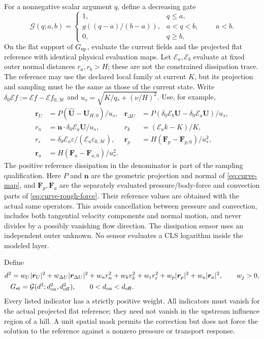 \documentclass[11pt,a4paper]{article}
\numberwithin{equation}{section}
\newcommand{\eps}{\varepsilon}
\newcommand{\qs}{q_*}
\begin{document}
For a nonnegative scalar argument $q$, define a decreasing gate
\begin{equation}
 \mathcal G(q;a,b)=
 \begin{cases}
 1,&q\le a,\\
 g((q-a)/(b-a)),&a<q<b,\\
 0,&q\ge b,
 \end{cases}
 \qquad a<b.
 \label{eq:transition-gate}
\end{equation}
On the flat support of $G_{\rm sp}$, evaluate the current fields and
the projected flat reference with identical physical evaluation maps.
Let $\mathcal E_a,\mathcal E_b$ evaluate at fixed outer normal distances
$r_a,r_b>H$; these are not the constrained dissipation trace.
The reference may use the declared local family at current $K$, but
its projection and sampling must be the same as those of the current
state. Write $\delta_0\mathcal E f:=\mathcal E f-\mathcal E f_{0,\mathcal M}$
and $u_s=\sqrt{K/\qs+(\nu/H)^2}$. Use, for example,
\begin{align}
 \bm r_U&=P(\widehat{\bm U}-\bm U_{H,0})/u_s,
 &\bm r_{\Delta U}&=P(\delta_0\mathcal E_b\bm U-
                         \delta_0\mathcal E_a\bm U)/u_s,\nonumber\\
 r_n&=\bm n\cdot\delta_0\mathcal E_a\bm U/u_s,
 &r_k&=(\mathcal E_a k-K)/K,\nonumber\\
 r_\eps&=\delta_0\mathcal E_a\eps/
                  (\mathcal E_a\eps_{0,\mathcal M}),
 &\bm r_p&=H(\bm F_p-\bm F_{p,0})/u_s^2,\nonumber\\
 \bm r_a&=H(\bm F_a-\bm F_{a,0})/u_s^2.
 \label{eq:transition-sensors}
\end{align}
The positive reference dissipation in the denominator is part of the
sampling qualification. Here $P$ and $\bm n$ are the geometric
projection and normal of \cref{eq:curve-map}, and $\bm F_p,\bm F_a$
are the separately evaluated pressure/body-force and convection parts
of \cref{eq:curve-rough-force}. Their reference values are obtained
with the actual same operators. This avoids cancellation between
pressure and convection, includes both tangential velocity components
and normal motion, and never divides by a possibly vanishing flow
direction. The dissipation sensor uses an independent outer unknown.
No sensor evaluates a CLS logarithm inside the modeled layer.

Define
\begin{equation}
 \begin{aligned}
 d^2={}&w_U|\bm r_U|^2+w_{\Delta U}|\bm r_{\Delta U}|^2
       +w_n r_n^2+w_k r_k^2+w_\eps r_\eps^2
       +w_p|\bm r_p|^2+w_a|\bm r_a|^2,\qquad w_j>0,\\
 G_{\rm st}&=\mathcal G(d^2;d_{\rm on}^2,d_{\rm off}^2),
 \qquad 0<d_{\rm on}<d_{\rm off}.
 \end{aligned}
 \label{eq:transition-state}
\end{equation}
Every listed indicator has a strictly positive weight. All indicators
must vanish for the actual projected flat reference; they need not
vanish in the upstream influence region of a hill. A unit spatial
mask permits the correction but does not force the solution to the
reference against a nonzero pressure or transport response.
\end{document}
